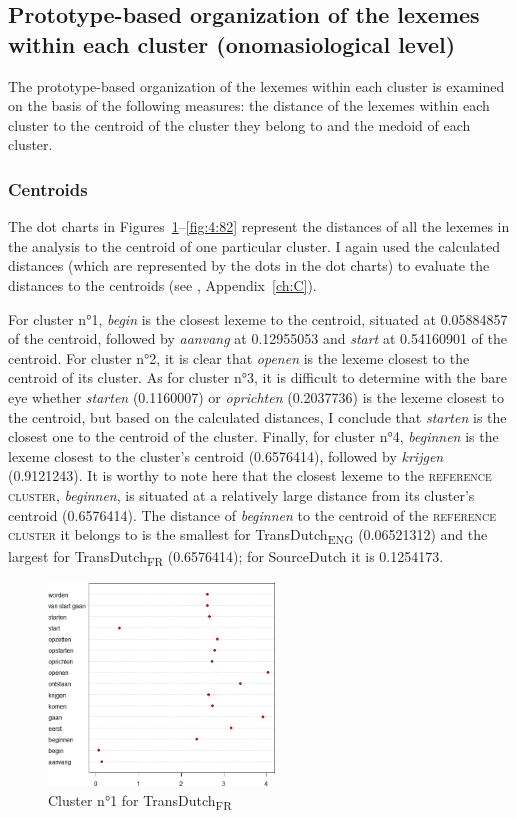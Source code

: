 \subsection{Prototype-based organization of the lexemes within each cluster (onomasiological level)}
\label{sec:4.4.3}  
The prototype-based organization of the lexemes within each cluster is examined on the basis of the following measures: the distance of the lexemes within each cluster to the centroid of the cluster they belong to and the medoid of each cluster.


\subsubsection{Centroids}
\label{sec:4.4.3.1}  
The dot charts in Figures~\ref{fig:4:79}--\ref{fig:4:82} represent the distances of all the lexemes in the analysis to the centroid of one particular cluster. I again used the calculated distances (which are represented by the dots in the dot charts) to evaluate the distances to the centroids (see , Appendix~\ref{ch:C}).

For cluster n°1, \textit{begin} is the closest lexeme to the centroid, situated at 0.05884857 of the centroid, followed by \textit{aanvang} at 0.12955053 and \textit{start} at 0.54160901 of the centroid. For cluster n°2, it is clear that \textit{openen} is the lexeme closest to the centroid of its cluster. As for cluster n°3, it is difficult to determine with the bare eye whether \textit{starten} (0.1160007) or \textit{oprichten} (0.2037736) is the lexeme closest to the centroid, but based on the calculated distances, I conclude that \textit{starten} is the closest one to the centroid of the cluster. Finally, for cluster n°4, \textit{beginnen} is the lexeme closest to the cluster’s centroid (0.6576414), followed by \textit{krijgen} (0.9121243). It is worthy to note here that the closest lexeme to the \textsc{reference cluster}, \textit{beginnen}, is situated at a relatively large distance from its cluster’s centroid (0.6576414). The distance of \textit{beginnen} to the centroid of the \textsc{reference cluster} it belongs to is the smallest for TransDutch\textsubscript{ENG} (0.06521312) and the largest for TransDutch\textsubscript{FR} (0.6576414); for SourceDutch it is 0.1254173.

\begin{figure}
\includegraphics[width=6cm]{figures/Vandevoorde2-img82.png}
\caption{\label{fig:4:79}Cluster n°1 for TransDutch\textsubscript{FR}}
\end{figure}

